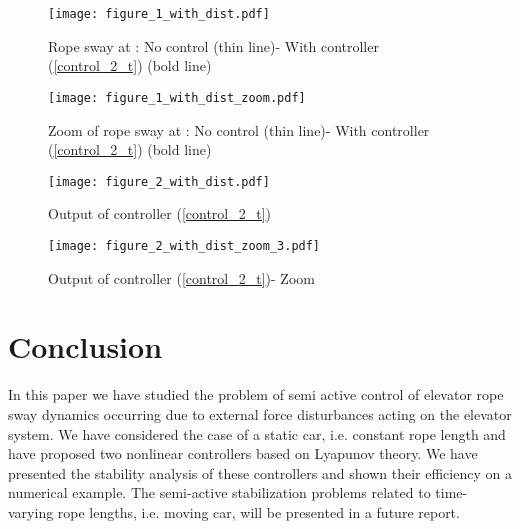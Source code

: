 \documentclass[letterpaper, 11 pt, conference]{ieeeconf}
\begin{document}
\begin{figure}
\centering
\texttt{[image: figure\_1\_with\_dist.pdf]}\vspace{-3cm}
\caption{Rope sway at : No control (thin line)- With
controller (\ref{control_2_t}) (bold line)}
\label{figure_1_with_dist} \vspace{-3cm}
\texttt{[image: figure\_1\_with\_dist\_zoom.pdf]}\vspace{-3cm}
\caption{Zoom of rope sway at : No control (thin line)-
With controller (\ref{control_2_t}) (bold line)}
\label{figure_1_with_dist_zoom}
\end{figure}
\begin{figure}
\centering
\texttt{[image: figure\_2\_with\_dist.pdf]}\vspace{-3cm}
\caption{Output of controller (\ref{control_2_t})}
\label{figure_2_with_dist} \vspace{-3cm}
\texttt{[image: figure\_2\_with\_dist\_zoom\_3.pdf]}\vspace{-3cm}
 \caption{Output of controller (\ref{control_2_t})- Zoom}
 \label{figure_2_with_dist_zoom}
\end{figure}
\section{Conclusion}\label{section4}
In this paper we have studied the problem of semi active control
of elevator rope sway dynamics occurring due to external force
disturbances acting on the elevator system. We have considered the
case of a static car, i.e. constant rope length and have proposed
two nonlinear controllers based on Lyapunov theory. We have
presented the stability analysis of these controllers and shown
their efficiency on a numerical example. The semi-active
stabilization problems related to time-varying rope lengths, i.e.
moving car, will be presented in a future report.
\end{document}

